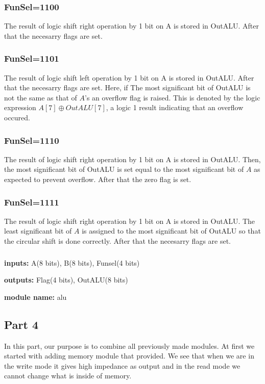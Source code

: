 \documentclass[pdftex,12pt,a4paper]{article}
\begin{document}
\subsubsection{FunSel=1100}
The result of logic shift right operation by 1 bit on A is stored in OutALU. After that the necesarry flags are set. 
\subsubsection{FunSel=1101}
The result of logic shift left operation by 1 bit on A is stored in OutALU. After that the necesarry flags are set.
\newline
Here, if The most significant bit of OutALU is not the same as that of $A$'s an overflow flag is raised. This is denoted by the logic
expression $A[7]\oplus{OutALU[7]}$, a logic 1 result indicating that an overflow occured.
\subsubsection{FunSel=1110}
The result of logic shift right operation by 1 bit on A is stored in OutALU. Then, the most significant bit of OutALU is set 
equal to the most significant bit of $A$ as expected to prevent overflow. After that the zero flag is set.
\subsubsection{FunSel=1111}
The result of logic shift right operation by 1 bit on A is stored in OutALU. The least significant bit of $A$ is assigned to the 
most significant bit of OutALU so that the circular shift is done correctly. After that the necesarry flags are set. 

\subsubsection{}
\textbf{inputs:}  
A(8 bits),
B(8 bits),
Funsel(4 bits)

\textbf{outputs:}    
Flag(4 bits),
OutALU(8 bits)

\textbf{module name:} alu

\subsection{Part 4}
In this part, our purpose is to combine all previously made modules. 
At first we started with adding memory module that provided. We see that when 
we are in the write mode it gives high impedance as output and in the read mode
 we cannot change what is inside of memory.
\end{document}
